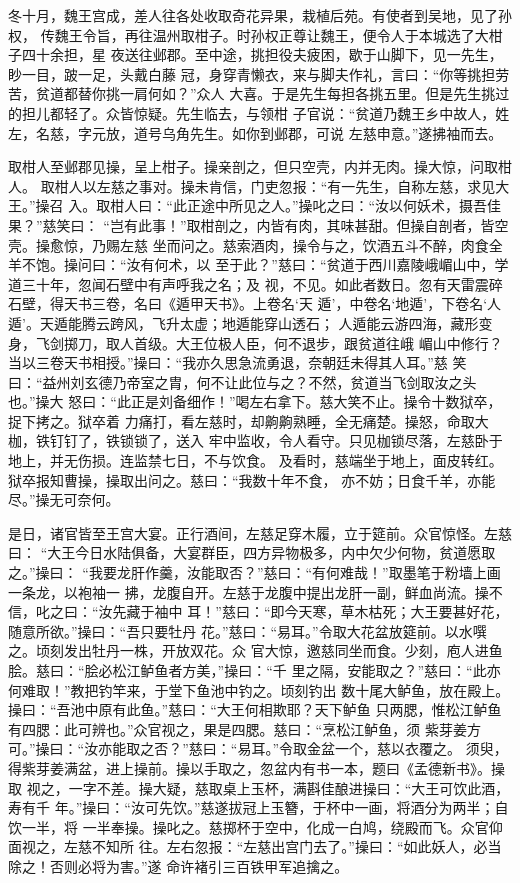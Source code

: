 冬十月，魏王宫成，差人往各处收取奇花异果，栽植后苑。有使者到吴地，见了孙权，
传魏王令旨，再往温州取柑子。时孙权正尊让魏王，便令人于本城选了大柑子四十余担，星
夜送往邺郡。至中途，挑担役夫疲困，歇于山脚下，见一先生，眇一目，跛一足，头戴白藤
冠，身穿青懒衣，来与脚夫作礼，言曰：“你等挑担劳苦，贫道都替你挑一肩何如？”众人
大喜。于是先生每担各挑五里。但是先生挑过的担儿都轻了。众皆惊疑。先生临去，与领柑
子官说：“贫道乃魏王乡中故人，姓左，名慈，字元放，道号乌角先生。如你到邺郡，可说
左慈申意。”遂拂袖而去。

取柑人至邺郡见操，呈上柑子。操亲剖之，但只空壳，内并无肉。操大惊，问取柑人。
取柑人以左慈之事对。操未肯信，门吏忽报：“有一先生，自称左慈，求见大王。”操召
入。取柑人曰：“此正途中所见之人。”操叱之曰：“汝以何妖术，摄吾佳果？”慈笑曰：
“岂有此事！”取柑剖之，内皆有肉，其味甚甜。但操自剖者，皆空壳。操愈惊，乃赐左慈
坐而问之。慈索酒肉，操令与之，饮酒五斗不醉，肉食全羊不饱。操问曰：“汝有何术，以
至于此？”慈曰：“贫道于西川嘉陵峨嵋山中，学道三十年，忽闻石壁中有声呼我之名；及
视，不见。如此者数日。忽有天雷震碎石壁，得天书三卷，名曰《遁甲天书》。上卷名‘天
遁’，中卷名‘地遁’，下卷名‘人遁’。天遁能腾云跨风，飞升太虚；地遁能穿山透石；
人遁能云游四海，藏形变身，飞剑掷刀，取人首级。大王位极人臣，何不退步，跟贫道往峨
嵋山中修行？当以三卷天书相授。”操曰：“我亦久思急流勇退，奈朝廷未得其人耳。”慈
笑曰：“益州刘玄德乃帝室之胄，何不让此位与之？不然，贫道当飞剑取汝之头也。”操大
怒曰：“此正是刘备细作！”喝左右拿下。慈大笑不止。操令十数狱卒，捉下拷之。狱卒着
力痛打，看左慈时，却齁齁熟睡，全无痛楚。操怒，命取大枷，铁钉钉了，铁锁锁了，送入
牢中监收，令人看守。只见枷锁尽落，左慈卧于地上，并无伤损。连监禁七日，不与饮食。
及看时，慈端坐于地上，面皮转红。狱卒报知曹操，操取出问之。慈曰：“我数十年不食，
亦不妨；日食千羊，亦能尽。”操无可奈何。

是日，诸官皆至王宫大宴。正行酒间，左慈足穿木履，立于筵前。众官惊怪。左慈曰：
“大王今日水陆俱备，大宴群臣，四方异物极多，内中欠少何物，贫道愿取之。”操曰：
“我要龙肝作羹，汝能取否？”慈曰：“有何难哉！”取墨笔于粉墙上画一条龙，以袍袖一
拂，龙腹自开。左慈于龙腹中提出龙肝一副，鲜血尚流。操不信，叱之曰：“汝先藏于袖中
耳！”慈曰：“即今天寒，草木枯死；大王要甚好花，随意所欲。”操曰：“吾只要牡丹
花。”慈曰：“易耳。”令取大花盆放筵前。以水噀之。顷刻发出牡丹一株，开放双花。众
官大惊，邀慈同坐而食。少刻，庖人进鱼脍。慈曰：“脍必松江鲈鱼者方美，”操曰：“千
里之隔，安能取之？”慈曰：“此亦何难取！”教把钓竿来，于堂下鱼池中钓之。顷刻钓出
数十尾大鲈鱼，放在殿上。操曰：“吾池中原有此鱼。”慈曰：“大王何相欺耶？天下鲈鱼
只两腮，惟松江鲈鱼有四腮：此可辨也。”众官视之，果是四腮。慈曰：“烹松江鲈鱼，须
紫芽姜方可。”操曰：“汝亦能取之否？”慈曰：“易耳。”令取金盆一个，慈以衣覆之。
须臾，得紫芽姜满盆，进上操前。操以手取之，忽盆内有书一本，题曰《孟德新书》。操取
视之，一字不差。操大疑，慈取桌上玉杯，满斟佳酿进操曰：“大王可饮此酒，寿有千
年。”操曰：“汝可先饮。”慈遂拔冠上玉簪，于杯中一画，将酒分为两半；自饮一半，将
一半奉操。操叱之。慈掷杯于空中，化成一白鸠，绕殿而飞。众官仰面视之，左慈不知所
往。左右忽报：“左慈出宫门去了。”操曰：“如此妖人，必当除之！否则必将为害。”遂
命许褚引三百铁甲军追擒之。

